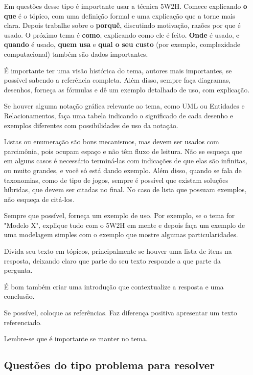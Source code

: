 \documentclass{article}
\begin{document}
Em questões desse tipo é importante usar a técnica 5W2H. Comece explicando \textbf{o que} é o tópico, com uma definição formal e uma explicação que a torne mais clara. Depois trabalhe sobre o \textbf{porquê}, discutindo motivação, razões por que é usado. O próximo tema é \textbf{como}, explicando como ele é feito. \textbf{Onde} é usado, e \textbf{quando} é usado, \textbf{quem usa} e \textbf{qual o seu custo} (por exemplo, complexidade computacional) também são dados importantes.

É importante ter uma visão histórica do tema, autores mais importantes, se possível sabendo a referência completa. Além disso, sempre faça diagramas, desenhos, forneça as fórmulas e dê um exemplo detalhado de uso, com explicação.

Se houver alguma notação gráfica relevante ao tema, como UML ou Entidades e Relacionamentos, faça uma tabela indicando o significado de cada desenho e exemplos diferentes com possibilidades de uso da notação.

Listas ou enumeração são bons mecanismos, mas devem ser usados com parcimônia, pois ocupam espaço e não têm fluxo de leitura. Não se esqueça que em alguns casos é necessário terminá-las com indicações de que elas são infinitas, ou muito grandes, e você só está dando exemplo. Além disso, quando se fala de taxonomias, como de tipo de jogos, sempre é possível que existam soluções híbridas, que devem ser citadas no final. No caso de lista que possuam exemplos, não esqueça de citá-los.

Sempre que possível, forneça um exemplo de uso. Por exemplo, se o tema for "Modelo X", explique tudo com o 5W2H em mente e depois faça um exemplo de uma modelagem simples com o exemplo que mostre algumas particularidades.

Divida seu texto em tópicos, principalmente se houver uma lista de itens na resposta, deixando claro que parte do seu texto responde a que parte da pergunta.

É bom também criar uma introdução que contextualize a resposta e uma conclusão.

Se possível, coloque as referências. Faz diferença positiva apresentar um texto referenciado.

Lembre-se que é importante se manter no tema.

\subsection{Questões do tipo problema para resolver}
\end{document}
